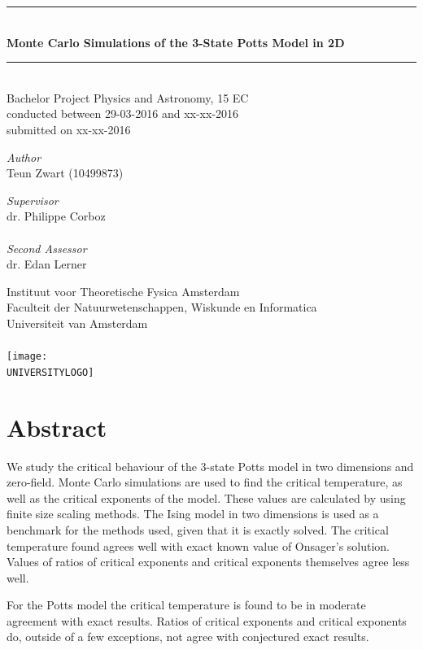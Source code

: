 \documentclass[11pt, a4paper]{report} %
\newcommand\TITLE{Monte Carlo Simulations of the 3-State Potts Model in 2D}
\newcommand\THESISFORM{Bachelor Project Physics and Astronomy, 15 EC\\conducted between 29-03-2016 and xx-xx-2016\\submitted on xx-xx-2016}
\newcommand\INSTITUTE{Instituut voor Theoretische Fysica Amsterdam}
\newcommand\FACULTY{Faculteit der Natuurwetenschappen, Wiskunde en Informatica}
\newcommand\UNIVERSITY{Universiteit van Amsterdam}
\newcommand\AUTHOR{Teun Zwart (10499873)}
\newcommand\SUPERVISOR{dr. Philippe Corboz}
\newcommand\SECONDASSESSOR{dr. Edan Lerner}
\newcommand\UNIVERSITYLOGO{UvA-logo.png} %
\begin{document}
\begin{titlepage}
	\begin{center}
		\rule{\textwidth}{0.4mm}\\[0.5cm]
		\huge{\textbf{\TITLE}}
		\rule{\textwidth}{0.4mm}\\[0.5cm]
		\large{\THESISFORM}\\[0.5cm]
		\begin{minipage}[t]{0.4\textwidth}
			\begin{flushleft}
				\large\emph{Author}\\{\AUTHOR}
			\end{flushleft}
		\end{minipage}
		\begin{minipage}[t]{0.4\textwidth}
			\begin{flushright}
				\large\emph{Supervisor}\\{\SUPERVISOR}\\~\\
				\large\emph{Second Assessor}\\{\SECONDASSESSOR}
			\end{flushright}
		\end{minipage}
		\vfill
		\large{\INSTITUTE}\\
		\large{\FACULTY}\\
		\large{\UNIVERSITY}\\~\\
		\texttt{[image: \\UNIVERSITYLOGO]}
	\end{center}
\end{titlepage}

\thispagestyle{plain}
\section*{Abstract}

We study the critical behaviour of the 3-state Potts model in two dimensions and zero-field.
Monte Carlo simulations are used to find the critical temperature, as well as the critical exponents of the model.
These values are calculated by using finite size scaling methods.
The Ising model in two dimensions is used as a benchmark for the methods used, given that it is exactly solved.
The critical temperature found agrees well with exact known value of Onsager's solution.
Values of ratios of critical exponents and critical exponents themselves agree less well.

For the Potts model the critical temperature is found to be in moderate agreement with exact results.
Ratios of critical exponents and critical exponents do, outside of a few exceptions, not agree with conjectured exact results.
\end{document}
